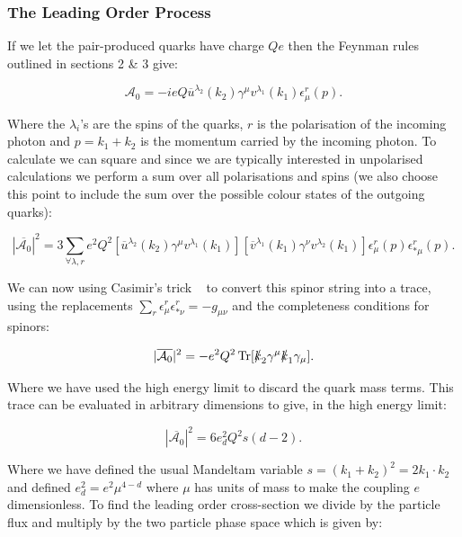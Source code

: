 	\subsubsection{The Leading Order Process}

	If we let the pair-produced quarks have charge $Qe$ then the Feynman rules outlined in sections 2 \& 3 give:

	\begin{equation}
	\mathcal{A}_0 = -ieQ\overline{u}^{\lambda_2}(k_2)\gamma^\mu v^{\lambda_1}(k_1)\epsilon^r_\mu(p).
	\end{equation}

	Where the $\lambda_i$'s are the spins of the quarks, $r$ is the polarisation of the incoming photon and $p = k_1 + k_2$ is
	the momentum carried by the incoming photon.  To calculate we can square and since we are typically interested in unpolarised
	calculations we perform a sum over all polarisations and spins (we also choose this point to include the sum over the possible
	colour states of the outgoing quarks):

	\begin{equation}
	|\overline{\mathcal{A}_0}|^2 = 3\sum_{\forall\lambda, r}e^2Q^2[\overline{u}^{\lambda_2}(k_2)\gamma^\mu v^{\lambda_1}(k_1)][\overline{v}^{\lambda_1}(k_1)\gamma^\nu v^{\lambda_2}(k_1)]\epsilon^r_\mu(p)\epsilon^r_{*\mu}(p).
	\end{equation}

	We can now using Casimir's trick ~\cite{griff} to convert this spinor string into a trace, using the replacements
	$\sum_r\epsilon^r_\mu\epsilon^r_{*\nu}=-g_{\mu\nu}$ and the completeness conditions for spinors:

	\begin{equation}
	|\overline{\mathcal{A}_0}|^2 = - e^2Q^2\operatorname{Tr}[\slashed k_2\gamma^\mu\slashed k_1\gamma_\mu].
	\end{equation}

	Where we have used the high energy limit to discard the quark mass terms.  This trace can be evaluated in arbitrary
	dimensions to give, in the high energy limit:

	\begin{equation}
	|\overline{\mathcal{A}_0}|^2 = 6e_d^2Q^2s(d-2).
	\end{equation}

	Where we have defined the usual Mandeltam variable $s=(k_1+k_2)^2=2k_1\cdot k_2$ and defined $e_d^2=e^2\mu^{4-d}$ where
	$\mu$ has units of mass to make the coupling $e$ dimensionless.  To find the leading order cross-section we divide by the
	particle flux and multiply by the two particle phase space which is given by:

